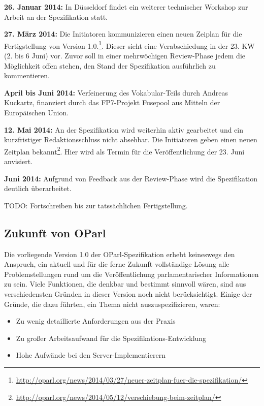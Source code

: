 \documentclass[,a4paper]{article}
\begin{document}
\textbf{26. Januar 2014:} In Düsseldorf findet ein weiterer technischer
Workshop zur Arbeit an der Spezifikation statt.

\textbf{27. März 2014:} Die Initiatoren kommunizieren einen neuen
Zeiplan für die Fertigstellung von Version 1.0.\footnote{\url{http://oparl.org/news/2014/03/27/neuer-zeitplan-fuer-die-spezifikation/}}.
Dieser sieht eine Verabschiedung in der 23. KW (2. bis 6 Juni) vor.
Zuvor soll in einer mehrwöchigen Review-Phase jedem die Möglichkeit
offen stehen, den Stand der Spezifikation ausführlich zu kommentieren.

\textbf{April bis Juni 2014:} Verfeinerung des Vokabular-Teils durch
Andreas Kuckartz, finanziert durch das FP7-Projekt Fusepool aus Mitteln
der Europäischen Union.

\textbf{12. Mai 2014:} An der Spezifikation wird weiterhin aktiv
gearbeitet und ein kurzfristiger Redaktionsschluss nicht absehbar. Die
Initiatoren geben einen neuen Zeitplan bekannt\footnote{\url{http://oparl.org/news/2014/05/12/verschiebung-beim-zeitplan/}}.
Hier wird als Termin für die Veröffentlichung der 23. Juni anvisiert.

\textbf{Juni 2014:} Aufgrund von Feedback aus der Review-Phase wird die
Spezifikation deutlich überarbeitet.

TODO: Fortschreiben bis zur tatssächlichen Fertigstellung.

\subsection{Zukunft von OParl}\label{zukunft-von-oparl}

Die vorliegende Version 1.0 der OParl-Spezifikation erhebt keineswegs
den Anspruch, ein aktuell und für die ferne Zukunft vollständige Lösung
alle Problemstellungen rund um die Veröffentlichung parlamentarischer
Informationen zu sein. Viele Funktionen, die denkbar und bestimmt
sinnvoll wären, sind aus verschiedensten Gründen in dieser Version noch
nicht berücksichtigt. Einige der Gründe, die dazu führten, ein Thema
nicht auszuspezifizieren, waren:

\begin{itemize}
\itemsep1pt\parskip0pt
\item
  Zu wenig detaillierte Anforderungen aus der Praxis
\item
  Zu großer Arbeitsaufwand für die Spezifikations-Entwicklung
\item
  Hohe Aufwände bei den Server-Implementierern
\end{itemize}
\end{document}
